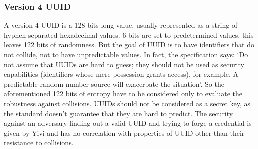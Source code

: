 \documentclass{report}
\begin{document}
\subsubsection{Version 4 UUID}\label{uuid_collision_discussion}
A version 4 UUID is a 128 bits-long value, usually represented as a string of hyphen-separated hexadecimal values. 6 bits are set to predetermined values, this leaves 122 bits of
randomness. But the goal of UUID is to have identifiers that do not collide, not to have unpredictable values. In fact, the specification says: \enquote*{Do not assume that UUIDs are 
hard to guess; they should not be used as security capabilities (identifiers whose mere possession grants access), for example. A predictable random number source will exacerbate the
situation}. So the aforementioned 122 bits of entropy have to be considered only to evaluate the robustness against collisions. UUIDs should not be considered as a secret key, as
the standard doesn't guarantee that they are hard to predict. The security against an adversary finding out a valid UUID and trying to forge a credential is given by Yivi and has
no correlation with properties of UUID other than their resistance to collisions.
\end{document}
